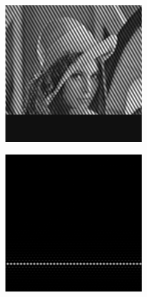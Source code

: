 \begin{figure}[ht!]
\begin{subfigure}[t]{0.23\textwidth}
        \caption{}
    \end{subfigure}\hfill
    \begin{subfigure}[t]{0.23\textwidth}
        \centering
        \includegraphics[width=\textwidth]{sim_slit/3/sim_vert_frame}
        \caption{}
    \end{subfigure}\hfill
    \begin{subfigure}[t]{0.23\textwidth}
        \centering
        \includegraphics[width=\textwidth]{sim_slit/3/sim_slit_pattern}

\end{subfigure}
\end{figure}
